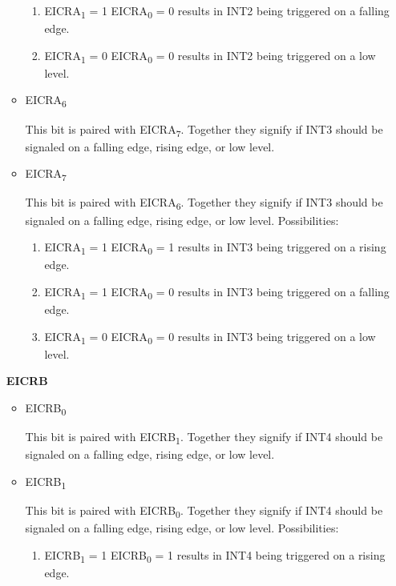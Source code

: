 \documentclass[12pt,letterpaper]{article}
\begin{document}
\begin{enumerate}
\begin{itemize}
\begin{enumerate}
				\item
				EICRA\textsubscript{1} = 1 EICRA\textsubscript{0} = 0 results in INT2 being triggered on a falling edge.
				
				\item
				EICRA\textsubscript{1} = 0 EICRA\textsubscript{0} = 0 results in INT2 being triggered on a low level.
			\end{enumerate}
			
				\item
			EICRA\textsubscript{6}
			
			This bit is paired with EICRA\textsubscript{7}.
			Together they signify if INT3 should be signaled on a falling edge, rising edge, or low level.
			
			\item 
			EICRA\textsubscript{7}
			
			This bit is paired with EICRA\textsubscript{6}.
			Together they signify if INT3 should be signaled on a falling edge, rising edge, or low level.
			Possibilities: 
			\begin{enumerate}
				\item
				EICRA\textsubscript{1} = 1 EICRA\textsubscript{0} = 1 results in INT3 being triggered on a rising edge.
				
				\item
				EICRA\textsubscript{1} = 1 EICRA\textsubscript{0} = 0 results in INT3 being triggered on a falling edge.
				
				\item
				EICRA\textsubscript{1} = 0 EICRA\textsubscript{0} = 0 results in INT3 being triggered on a low level.
			\end{enumerate}
			
			
		\end{itemize}

	\textbf{EICRB}

		\begin{itemize}
			\item
			EICRB\textsubscript{0}
			
			This bit is paired with EICRB\textsubscript{1}.
			Together they signify if INT4 should be signaled on a falling edge, rising edge, or low level.
			
			\item 
			EICRB\textsubscript{1}
			
			This bit is paired with EICRB\textsubscript{0}.
			Together they signify if INT4 should be signaled on a falling edge, rising edge, or low level.
			Possibilities: 
			\begin{enumerate}
				\item
				EICRB\textsubscript{1} = 1 EICRB\textsubscript{0} = 1 results in INT4 being triggered on a rising edge.
				

\end{enumerate}
\end{itemize}
\end{enumerate}
\end{document}
